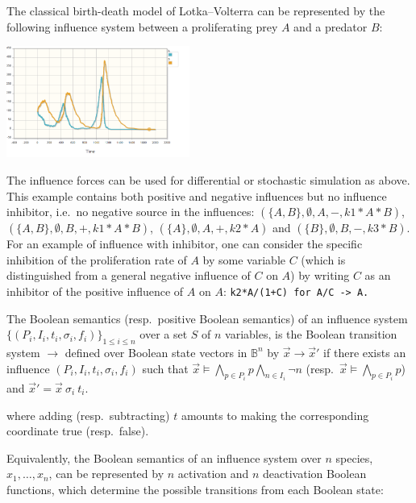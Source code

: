 \documentclass{llncs}
\newcommand{\lra}{\longrightarrow}
\begin{document}
\begin{example}\label{ex:LVi}
   The classical birth-death model of Lotka--Volterra can be represented by the following
influence system between a proliferating prey $A$ and a predator $B$:
  

\vspace{-2cm}\hfill\includegraphics[width=0.45\textwidth]{LVstoch.png}

The influence forces can be used for differential or stochastic simulation as above.
This example contains both positive and negative influences but no influence inhibitor, i.e.~no negative source in the influences:
$(\{A, B\}, \emptyset, A, -, k1*A*B)$, $(\{A, B\}, \emptyset, B, +, k1*A*B)$, $(\{A\}, \emptyset, A, +, k2*A)$ and $(\{B\}, \emptyset, B, -, k3*B)$.
For an example of influence with inhibitor, one can consider the specific inhibition of the proliferation rate of $A$ by some variable $C$
(which is distinguished from a general negative influence of $C$ on $A$) by writing $C$ as an inhibitor of the positive influence of $A$ on $A$:
\verb|k2*A/(1+C) for A/C -> A.|
\end{example}



\begin{definition}
   The Boolean semantics (resp.~positive Boolean semantics) of an influence system $\{(P_i, I_i, t_i, \sigma_i,
   f_i)\}_{1\leq i\leq n}$
   over a set $S$ of $n$ variables,
   is the Boolean transition system $\lra$ defined over Boolean state vectors in $\mathbb{B}^n$
   by
   ${\vec x}\lra{\vec x'}$ if there exists an influence $(P_i, I_i, t_i, \sigma_i, f_i)$
   such that ${\vec x}\models \bigwedge_{p\in P_i} p\bigwedge_{n\in I_i} \neg n$ (resp.~${\vec x}\models \bigwedge_{p\in P_i} p$)
   and ${\vec x'} = {\vec x}\ \sigma_i\ t_i$.
\end{definition}
where adding (resp.\ subtracting) $t$ amounts to making the corresponding
coordinate true (resp.\ false).

Equivalently, the Boolean semantics of an influence system over $n$ species, $x_1,\ldots,x_n$,
can be represented by $n$ activation and $n$ deactivation Boolean functions, 
 which determine the possible transitions from each Boolean state:
\end{document}
